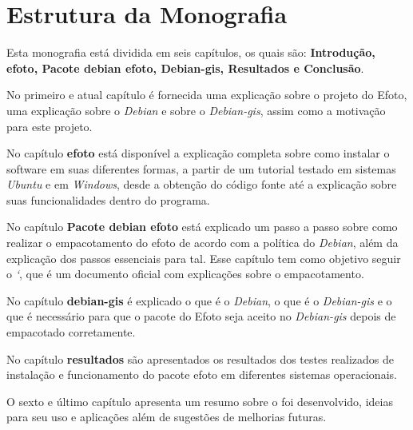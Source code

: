 \section*{Estrutura da Monografia}

Esta monografia está dividida em seis capítulos, os quais são: \textbf{Introdução, efoto, Pacote debian efoto, Debian-gis, Resultados e Conclusão}.

No primeiro e atual capítulo é fornecida uma explicação sobre o projeto do Efoto, uma explicação sobre o \textit{Debian} e sobre o \textit{Debian-gis}, assim como a motivação para este projeto.

No capítulo \textbf{efoto} está disponível a explicação completa sobre como instalar o software em suas diferentes formas, a partir de um tutorial testado em sistemas \textit{Ubuntu} e em \textit{Windows}, desde a obtenção do código fonte até a explicação sobre suas funcionalidades dentro do programa.

No capítulo \textbf{Pacote debian efoto} está explicado um passo a passo sobre como realizar o empacotamento do efoto de acordo com a política do \textit{Debian}, além da explicação dos passos essenciais para tal. Esse capítulo tem como objetivo seguir o \textit{`}, que é um documento oficial com explicações sobre o empacotamento.

No capítulo \textbf{debian-gis} é explicado o que é o \textit{Debian}, o que é o \textit{Debian-gis} e o que é necessário para que o pacote do Efoto seja aceito no \textit{Debian-gis} depois de empacotado corretamente.

No capítulo \textbf{resultados} são apresentados os resultados dos testes realizados de instalação e funcionamento do pacote efoto em diferentes sistemas operacionais.

O sexto e último capítulo apresenta um resumo sobre o foi desenvolvido, ideias para seu uso e aplicações além de sugestões de melhorias futuras.
